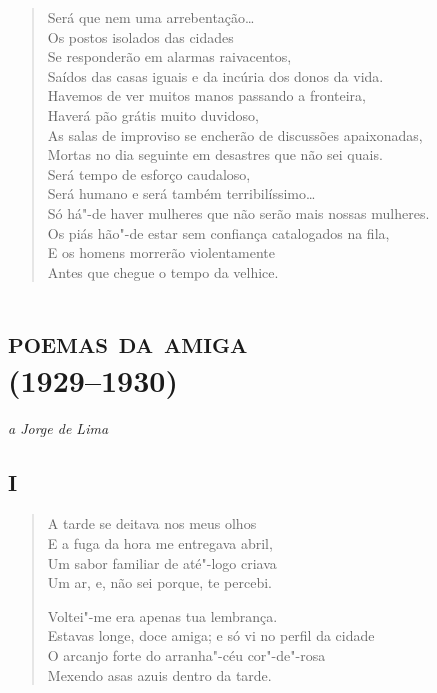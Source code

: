 \begin{verse}
Será que nem uma arrebentação\ldots{}\\
Os postos isolados das cidades\\
Se responderão em alarmas raivacentos,\\
Saídos das casas iguais e da incúria dos donos da vida.\\
Havemos de ver muitos manos passando a fronteira,\\
Haverá pão grátis muito duvidoso,\\
As salas de improviso se encherão de discussões apaixonadas,\\
Mortas no dia seguinte em desastres que não sei quais.\\
Será tempo de esforço caudaloso,\\
Será humano e será também terribilíssimo\ldots{}\\
Só há"-de haver mulheres que não serão mais nossas mulheres.\\
Os piás hão"-de estar sem confiança catalogados na fila,\\
E os homens morrerão violentamente\\
Antes que chegue o tempo da velhice.
\end{verse}

\chapter[\textsc{poemas da amiga}\\I\ \ \ ``A tarde se deitava nos meus olhos'']{\textsc{poemas da amiga}\\(1929--1930)}

\begin{flushright}
\emph{a Jorge de Lima}
\end{flushright}

\section*{I}

\begin{verse}
A tarde se deitava nos meus olhos\\
E a fuga da hora me entregava abril,\\
Um sabor familiar de até"-logo criava\\
Um ar, e, não sei porque, te percebi.

Voltei"-me era apenas tua lembrança.\\
Estavas longe, doce amiga; e só vi no perfil da cidade\\
O arcanjo forte do arranha"-céu cor"-de"-rosa\\
Mexendo asas azuis dentro da tarde.
\end{verse}


